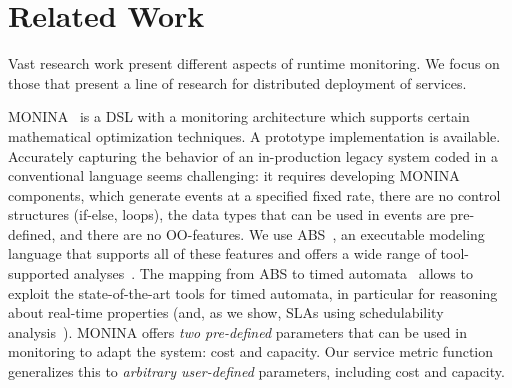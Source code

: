 

\section{Related Work}
\label{ch04:sec:relatedwork}

Vast research work present different aspects of runtime monitoring.
We focus on those that present a line of research for distributed deployment of services.

MONINA~\cite{inzinger:monitoring} is a DSL with a monitoring architecture
which supports certain mathematical optimization techniques.
A prototype implementation is available.
Accurately capturing the
behavior of an in-production legacy system coded in a
conventional language seems challenging: it requires
developing MONINA components, which
generate events at a specified fixed rate,  there are no control structures (if-else, loops), the data types that can be used in events are pre-defined, and there are no OO-features. 
We use ABS~\cite{johnsen2012abs}, an executable modeling language
that supports all of these features and offers a wide range of tool-supported analyses~\cite{BubelMH14,WongBBGGHMS15}.  The mapping from ABS to timed automata~\cite{alur:1994:timedautomata} allows to
exploit the state-of-the-art tools for timed automata, in
particular for reasoning about real-time properties (and, as we show, SLAs using
schedulability analysis~\cite{fersman2007task}).
MONINA offers \emph{two pre-defined} parameters that can be used in monitoring to adapt
the system: cost and capacity.  Our service metric function generalizes this to
\emph{arbitrary user-defined} parameters, including cost and capacity.

